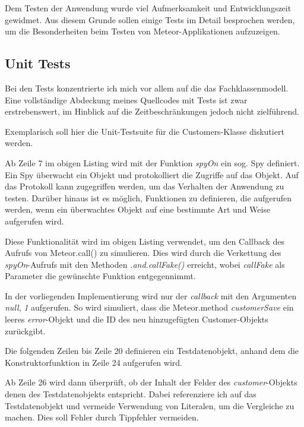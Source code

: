 Dem Testen der Anwendung wurde viel Aufmerksamkeit und Entwicklungszeit
gewidmet. Aus diesem Grunde sollen einige Tests im Detail besprochen werden, um
die Besonderheiten beim Testen von Meteor-Applikationen aufzuzeigen.

\subsection{Unit Tests}

Bei den Tests konzentrierte ich mich vor allem auf die das Fachklassenmodell.
Eine vollständige Abdeckung meines Quellcodes mit Tests ist zwar erstrebenswert,
im Hinblick auf die Zeitbeschränkungen jedoch nicht zielführend.

Exemplarisch soll hier die Unit-Testsuite für die Customers-Klasse diskutiert
werden.



Ab Zeile 7 im obigen Listing wird mit der Funktion \textit{spyOn} ein sog. Spy
definiert. Ein Spy überwacht ein Objekt und protokolliert die Zugriffe auf das
Objekt. Auf das Protokoll kann zugegriffen werden, um das Verhalten der
Anwendung zu testen. Darüber hinaus ist es möglich, Funktionen zu definieren,
die aufgerufen werden, wenn ein überwachtes Objekt auf eine bestimmte Art und
Weise aufgerufen wird.

Diese Funktionalität wird im obigen Listing verwendet, um den Callback des
Aufrufs von Meteor.call() zu simulieren. Dies wird durch die Verkettung des
\textit{spyOn}-Aufrufs mit den Methoden \textit{.and.callFake()} erreicht, wobei
\textit{callFake} als Parameter die gewünschte Funktion entgegennimmt.

In der vorliegenden Implementierung wird nur der \textit{callback} mit den
Argumenten \textit{null}, \textit{1} aufgerufen. So wird simuliert, dass die
Meteor.method \textit{customerSave} ein leeres \textit{error}-Objekt und die ID
des neu hinzugefügten Customer-Objekts zurückgibt.

Die folgenden Zeilen bis Zeile 20 definieren ein Testdatenobjekt, anhand dem die
Konstruktorfunktion in Zeile 24 aufgerufen wird.

Ab Zeile 26 wird dann überprüft, ob der Inhalt der Felder des
\textit{customer}-Objekts denen des Testdatenobjekts entspricht. Dabei
referenziere ich auf das Testdatenobjekt und vermeide Verwendung von Literalen,
um die Vergleiche zu machen. Dies soll Fehler durch Tippfehler vermeiden.

